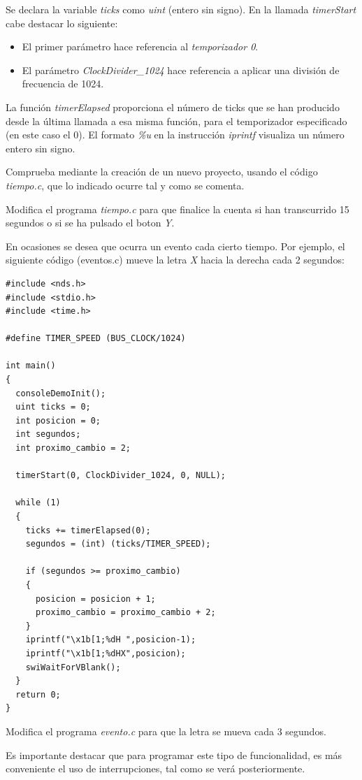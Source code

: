 Se declara la variable \textit{ticks} como \textit{uint} (entero sin signo). En la llamada \textit{timerStart} cabe destacar lo si\-guien\-te:
\begin{itemize}
\item El primer parámetro hace referencia al \textit{temporizador 0}.
%
\item El parámetro \textit{ClockDivider\_1024} hace referencia a aplicar una división de frecuencia de 1024.
\end{itemize}

La función \textit{timerElapsed} proporciona el número de ticks que se han producido desde la última llamada a esa misma función, para el temporizador especificado (en este caso el 0).  El formato \textit{\%u} en la instrucción \textit{iprintf}  visualiza un número entero sin signo.

\begin{exercise}
	Comprueba mediante la creación de un nuevo proyecto, usando el código \textit{tiempo.c}, que lo indicado ocurre tal y como se comenta.
\end{exercise}

\begin{exercise}
Modifica el programa \textit{tiempo.c} para que finalice la cuenta si han transcurrido 15 segundos o si se ha pulsado el boton \textit{Y}.
\end{exercise}

En ocasiones se desea que ocurra un evento cada cierto tiempo. Por ejemplo, el siguiente código (eventos.c) mueve la letra \textit{X} hacia la derecha cada 2 segundos:

\begin{lstlisting}
#include <nds.h>
#include <stdio.h>
#include <time.h>

#define TIMER_SPEED (BUS_CLOCK/1024)

int main()
{
  consoleDemoInit();
  uint ticks = 0;
  int posicion = 0;
  int segundos;
  int proximo_cambio = 2;

  timerStart(0, ClockDivider_1024, 0, NULL);

  while (1)
  {
    ticks += timerElapsed(0);
    segundos = (int) (ticks/TIMER_SPEED);

    if (segundos >= proximo_cambio)
    {
      posicion = posicion + 1;
      proximo_cambio = proximo_cambio + 2;
    }
    iprintf("\x1b[1;%dH ",posicion-1);
    iprintf("\x1b[1;%dHX",posicion);
    swiWaitForVBlank();
  }
  return 0;
}
\end{lstlisting}

\begin{exercise}
	Modifica el programa \textit{evento.c} para que la letra se mueva cada 3 segundos.
\end{exercise}

Es importante destacar que para programar este tipo de funcionalidad, es más conveniente el uso de interrupciones, tal como se verá posteriormente.

